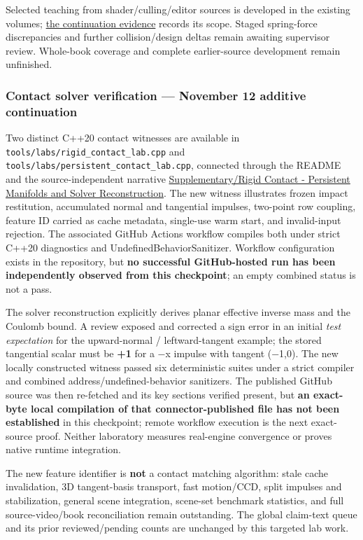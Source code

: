 Selected teaching from shader/culling/editor sources is developed in the existing volumes; \hyperref[appendix-a103e7846d21-november-12-continuation-clipping-conservative-bounds-and-editor-state]{the continuation evidence} records its scope. Staged spring-force discrepancies and further collision/design deltas remain awaiting supervisor review. Whole-book coverage and complete earlier-source development remain unfinished.

\subsubsection{Contact solver verification --- November 12 additive continuation}\label{appendix-3b67654799a2-contact-solver-verification-november-12-additive-continuation}

Two distinct C++20 contact witnesses are available in \texttt{tools/labs/rigid\_contact\_lab.cpp} and \texttt{tools/labs/persistent\_contact\_lab.cpp}, connected through the README and the source-independent narrative \hyperref[appendix-c9d92e145503]{Supplementary/Rigid Contact - Persistent Manifolds and Solver Reconstruction}. The new witness illustrates frozen impact restitution, accumulated normal and tangential impulses, two-point row coupling, feature ID carried as cache metadata, single-use warm start, and invalid-input rejection. The associated GitHub Actions workflow compiles both under strict C++20 diagnostics and UndefinedBehaviorSanitizer. Workflow configuration exists in the repository, but \textbf{no successful GitHub-hosted run has been independently observed from this checkpoint}; an empty combined status is not a pass.

The solver reconstruction explicitly derives planar effective inverse mass and the Coulomb bound. A review exposed and corrected a sign error in an initial \emph{test expectation} for the upward-normal / leftward-tangent example; the stored tangential scalar must be \textbf{+1} for a −x impulse with tangent (−1,0). The new locally constructed witness passed six deterministic suites under a strict compiler and combined address/undefined-behavior sanitizers. The published GitHub source was then re-fetched and its key sections verified present, but \textbf{an exact-byte local compilation of that connector-published file has not been established} in this checkpoint; remote workflow execution is the next exact-source proof. Neither laboratory measures real-engine convergence or proves native runtime integration.

The new feature identifier is \textbf{not} a contact matching algorithm: stale cache invalidation, 3D tangent-basis transport, fast motion/CCD, split impulses and stabilization, general scene integration, scene-set benchmark statistics, and full source-video/book reconciliation remain outstanding. The global claim-text queue and its prior reviewed/pending counts are unchanged by this targeted lab work.

